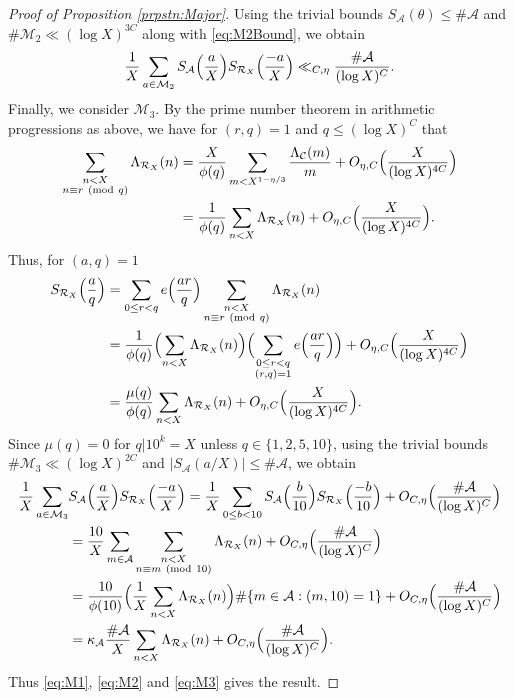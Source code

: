 \documentclass[10pt]{amsart}
\theoremstyle{plain}
\numberwithin{sblmm}{thrm}
\numberwithin{equation}{section}
\newcommand{\Mod}[1]{\ (\mathrm{mod}\ #1)}
\begin{document}
\begin{proof}[Proof of Proposition \ref{prpstn:Major}]
Using the trivial bounds $S_{\mathcal{A}}(\theta)\le \#\mathcal{A}$ and $\#\mathcal{M}_2\ll (\log{X})^{3C}$ along with \eqref{eq:M2Bound}, we obtain
%
\begin{equation}
\frac{1}{X}\sum_{a\in\mathcal{M}_2}S_{\mathcal{A}}\Bigl(\frac{a}{X}\Bigr)S_{\mathcal{R}_X}\Bigl(\frac{-a}{X}\Bigr)\ll_{C,\eta} \frac{\#\mathcal{A}}{(\log{X})^C}.
\label{eq:M2}
\end{equation}
 Finally, we consider $\mathcal{M}_3$. By the prime number theorem in arithmetic progressions as above, we have for $(r,q)=1$ and $q\le (\log{X})^C$ that
\begin{align*}
\sum_{\substack{n< X\\ n\equiv r\Mod{q}}}\Lambda_{\mathcal{R}_X}(n)&=\frac{X}{\phi(q)}\sum_{m<X^{1-\eta/3}}\frac{\Lambda_{\mathcal{C}}(m)}{m}+O_{\eta,C}\Bigl(\frac{X}{(\log{X})^{4C}}\Bigr)\\
&=\frac{1}{\phi(q)}\sum_{n< X}\Lambda_{\mathcal{R}_X}(n)+O_{\eta,C}\Bigl(\frac{X}{(\log{X})^{4C}}\Bigr).
\end{align*}
Thus, for $(a,q)=1$
\begin{align*}
S_{\mathcal{R}_X}\Bigl(\frac{a}{q}\Bigr)&=\sum_{0\le r<q}e\Bigl(\frac{a r}{q}\Bigr)\sum_{\substack{n< X\\ n\equiv r\Mod{q}}}\Lambda_{\mathcal{R}_X}(n)\\
&=\frac{1}{\phi(q)}\Bigl(\sum_{n< X}\Lambda_{\mathcal{R}_X}(n)\Bigr)\Bigl(\sum_{\substack{0\le r<q\\ (r,q)=1}}e\Bigl(\frac{a r}{q}\Bigr)\Bigr)+O_{\eta,C}\Bigl(\frac{X}{(\log{X})^{4C}}\Bigr)\\
&=\frac{\mu(q)}{\phi(q)}\sum_{n< X}\Lambda_{\mathcal{R}_X}(n)+O_{\eta,C}\Bigl(\frac{X}{(\log{X})^{4C}}\Bigr).
\end{align*}
Since $\mu(q)=0$ for $q|10^k=X$ unless $q\in\{1,2,5,10\}$, using the trivial bounds $\#\mathcal{M}_3\ll (\log{X})^{2C}$ and $|S_\mathcal{A}(a/X)|\le \#\mathcal{A}$, we obtain
%
\begin{align}
\frac{1}{X}\sum_{a\in\mathcal{M}_3}&S_{\mathcal{A}}\Bigl(\frac{a}{X}\Bigr)S_{\mathcal{R}_X}\Bigl(\frac{-a}{X}\Bigr)
=\frac{1}{X}\sum_{0\le b<10}S_{\mathcal{A}}\Bigl(\frac{b}{10}\Bigr)S_{\mathcal{R}_X}\Bigl(\frac{-b}{10}\Bigr)+O_{C,\eta}\Bigl(\frac{\#\mathcal{A}}{(\log{X})^C}\Bigr)\nonumber\\
&=\frac{10}{X}\sum_{m\in\mathcal{A}}\sum_{\substack{n<X\\ n\equiv m\Mod{10}}}\Lambda_{\mathcal{R}_X}(n)+O_{C,\eta}\Bigl(\frac{\#\mathcal{A}}{(\log{X})^C}\Bigr)\nonumber\\
&=\frac{10}{\phi(10)}\Bigl(\frac{1}{X}\sum_{n< X}\Lambda_{\mathcal{R}_X}(n)\Bigr)\#\{m\in\mathcal{A}:(m,10)=1\}+O_{C,\eta}\Bigl(\frac{\#\mathcal{A}}{(\log{X})^C}\Bigr)\nonumber\\
&=\kappa_\mathcal{A}\frac{\#\mathcal{A}}{X}\sum_{n<X}\Lambda_{\mathcal{R}_X}(n)+O_{C,\eta}\Bigl(\frac{\#\mathcal{A}}{(\log{X})^C}\Bigr).
\label{eq:M3}
\end{align}
%
Thus \eqref{eq:M1}, \eqref{eq:M2} and \eqref{eq:M3} gives the result.
%
\end{proof}
\end{document}
